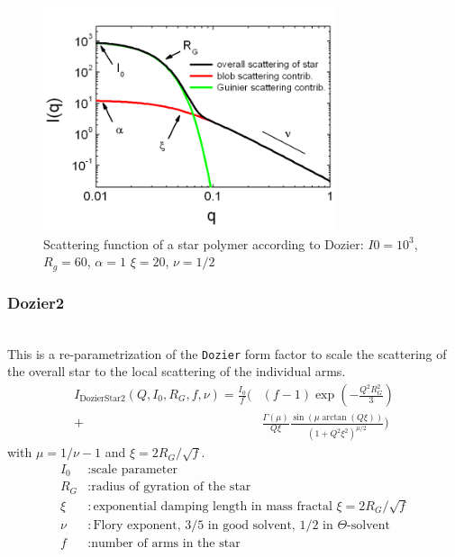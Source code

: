 \begin{figure}[htb]
\begin{center}
\includegraphics[width=0.768\textwidth,height=0.588\textwidth]{Dozier_Iq.png}
\end{center}
\caption{Scattering function of a star polymer according to Dozier: $I0=10^3$, $R_g=60$, $\alpha=1$
$\xi=20$, $\nu=1/2$ } \label{fig:IQDozierStar1}
\end{figure}

\clearpage
\subsubsection{Dozier2}
\label{sect:DozierStar2}
~\\
This is a re-parametrization of the \texttt{Dozier} form factor
to scale the scattering of the overall star to the local scattering of the individual arms.
\begin{align}
I_\text{DozierStar2}(Q,I_0,R_G,f,\nu)=
\frac{I_0}{f}
\Biggl(
 &  (f-1)
    \exp\left(-\frac{Q^2R_G^2}{3}\right) \\
 +&  \frac{\Gamma(\mu)}{Q\xi}
    \frac{\sin(\mu\arctan(Q\xi))}{(1+Q^2\xi^2)^{\mu/2}} \nonumber
\Biggr)
\end{align}
with $\mu=1/\nu-1$ and $\xi=2R_G/\sqrt{f}$.
\begin{align}
I_0      & : \text{scale parameter} \nonumber \\
R_G      & : \text{radius of gyration of the star} \nonumber \\
\xi      & : \text{exponential damping length in mass fractal } \xi=2R_G/\sqrt{f}\nonumber \\
\nu      & : \text{Flory exponent, 3/5 in good solvent, 1/2 in $\Theta$-solvent} \nonumber \\
f & : \text{number of arms in the star} \nonumber \\
\end{align}

